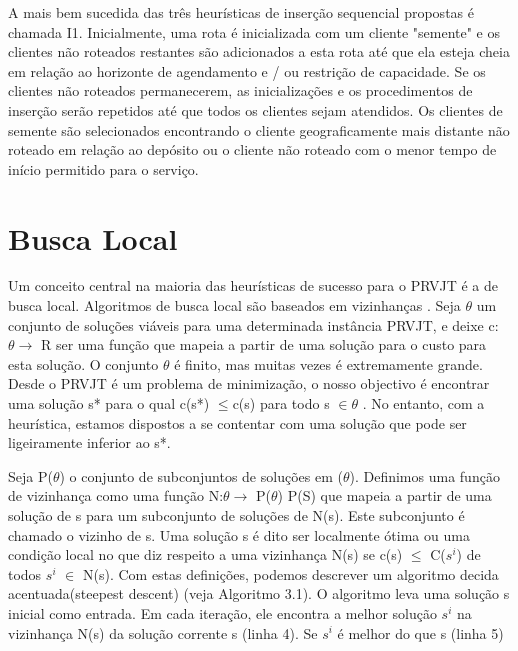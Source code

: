 A mais bem sucedida das três heurísticas de inserção sequencial propostas é chamada I1. Inicialmente, uma rota é inicializada com um cliente "semente" e os clientes não roteados restantes são adicionados a esta rota até que ela esteja cheia em relação ao horizonte de agendamento e / ou restrição de capacidade. Se os clientes não roteados permanecerem, as inicializações e os procedimentos de inserção serão repetidos até que todos os clientes sejam atendidos. Os clientes de semente são selecionados encontrando o cliente geograficamente mais distante não roteado em relação ao depósito ou o cliente não roteado com o menor tempo de início permitido para o serviço.


\section{Busca Local}

Um conceito central na maioria das heurísticas de sucesso para o PRVJT é a de busca local. Algoritmos de busca local são baseados em vizinhanças . Seja $\theta$ um conjunto de soluções viáveis para uma determinada instância PRVJT, e deixe c: $\theta \to$ R ser uma função que mapeia a partir de uma solução para o custo para esta solução. O conjunto $\theta$ é finito, mas muitas vezes é extremamente grande. Desde o PRVJT é um problema de minimização, o nosso objectivo é encontrar uma solução s* para o qual c(s*) $ \leq $c(s) para todo s $\in \theta$ . No entanto, com a heurística, estamos dispostos a se contentar com uma solução que pode ser ligeiramente inferior ao s*.

 
 Seja P($\theta$) o conjunto de subconjuntos de soluções em ($\theta$). Definimos uma função de vizinhança como uma função N:$\theta \to $ P($\theta$) P(S) que mapeia a partir de uma solução de s para um subconjunto de soluções de N(s). Este subconjunto é chamado o vizinho de s. Uma solução s é dito ser localmente ótima ou uma condição local no que diz respeito a uma vizinhança N(s) se c(s) $ \leq $ C($s^i$) de todos $s^i$ $ \in $ N(s). Com estas definições, podemos descrever um algoritmo decida acentuada(steepest descent) (veja Algoritmo 3.1). O algoritmo leva uma solução s inicial como entrada. Em cada iteração, ele encontra a melhor solução $s^i$ na vizinhança N(s) da solução corrente s (linha 4). Se $s^i$ é melhor do que s (linha 5)
 
